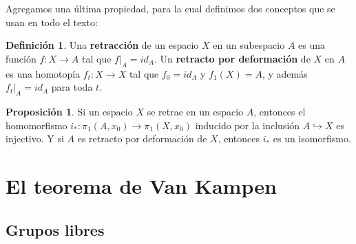 \documentclass[spanish]{book}
\theoremstyle{definition}
\newtheorem*{defn}{Definición}
\newtheorem*{prop}{Proposición}
\begin{document}
	Agregamos una última propiedad, para la cual definimos dos conceptos que se usan en todo el texto:
	\begin{defn}\label{def:retracto}
		Una \textbf{retracción} de un espacio $X$ en un subespacio $A$ es una función $f:X\to A$ tal que $f|_A=id_A$. Un \textbf{retracto por deformación} de $X$ en $A$ es una homotopía $f_t:X\to X$ tal que $f_0=id_A$ y $f_1(X)=A$, y además $f_t|_A=id_A$ para toda $t$.
	\end{defn}
	\begin{prop}
		Si un espacio $X$ se retrae en un espacio $A$, entonces el homomorfismo $i_*:\pi_1(A,x_0)\to\pi_1(X,x_0)$ inducido por la inclusión $A\hookrightarrow X$ es injectivo. Y si $A$ es retracto por deformación de $X$, entonces $i_*$ es un isomorfismo.
	\end{prop}
\chapter{El teorema de Van Kampen}
\section{Grupos libres}
\end{document}
